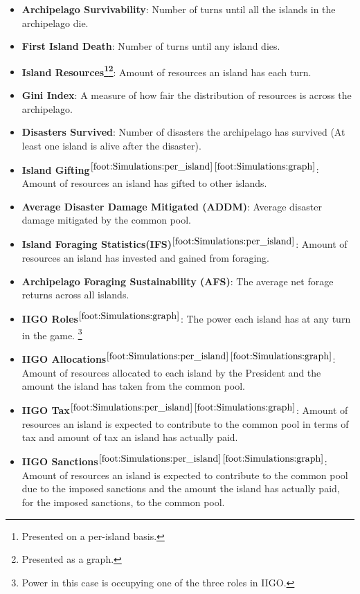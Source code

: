 \begin{itemize}
    \item \textbf{Archipelago Survivability}: Number of turns until all the islands in the archipelago die.
    \item \textbf{First Island Death}: Number of turns until any island dies.
    \item \textbf{Island Resources\footnote{\label{foot:Simulations:per_island}Presented on a per-island basis.}\footnote{\label{foot:Simulations:graph}Presented as a graph.}}: Amount of resources an island has each turn.
    \item \textbf{Gini Index}: A measure of how fair the distribution of resources is across the archipelago.
    \item \textbf{Disasters Survived}: Number of disasters the archipelago has survived (At least one island is alive after the disaster).
    \item \textbf{Island Gifting$^{\ref{foot:Simulations:per_island}}$$^{\ref{foot:Simulations:graph}}$}: Amount of resources an island has gifted to other islands.
    \item \textbf{Average Disaster Damage Mitigated (ADDM)}: Average disaster damage mitigated by the common pool.
    \item \textbf{Island Foraging Statistics(IFS)$^{\ref{foot:Simulations:per_island}}$}: Amount of resources an island has invested and gained from foraging.
    \item \textbf{Archipelago Foraging Sustainability (AFS)}: The average net forage returns across all islands.
    \item \textbf{IIGO Roles$^{\ref{foot:Simulations:graph}}$}: The power each island has at any turn in the game. \footnote{Power in this case is occupying one of the three roles in IIGO.}
    \item \textbf{IIGO Allocations$^{\ref{foot:Simulations:per_island}}$$^{\ref{foot:Simulations:graph}}$}: Amount of resources allocated to each island by the President and the amount the island has taken from the common pool.
    \item \textbf{IIGO Tax$^{\ref{foot:Simulations:per_island}}$$^{\ref{foot:Simulations:graph}}$}: Amount of resources an island is expected to contribute to the common pool in terms of tax and amount of tax an island has actually paid.
    \item \textbf{IIGO Sanctions$^{\ref{foot:Simulations:per_island}}$$^{\ref{foot:Simulations:graph}}$}: Amount of resources an island is expected to contribute to the common pool due to the imposed sanctions and the amount the island has actually paid, for the imposed sanctions, to the common pool.
    
\end{itemize}

